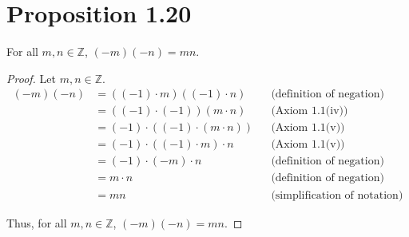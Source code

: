 \section*{Proposition 1.20}
For all $m, n \in \mathbb{Z}$, $(-m)(-n) = mn$.
\begin{proof}
    Let $m, n \in \mathbb{Z}$.
    \begin{align*}
        (-m)(-n) & = ((-1) \cdot m)((-1) \cdot n)        &  & \text{(definition of negation)}     \\
                 & = ((-1) \cdot (-1))(m \cdot n)        &  & \text{(Axiom 1.1(iv))}              \\
                 & = (-1) \cdot ((-1) \cdot (m \cdot n)) &  & \text{(Axiom 1.1(v))}               \\
                 & = (-1) \cdot ((-1) \cdot m) \cdot n   &  & \text{(Axiom 1.1(v))}               \\
                 & = (-1) \cdot (-m) \cdot n             &  & \text{(definition of negation)}     \\
                 & = m \cdot n                           &  & \text{(definition of negation)}     \\
                 & = mn                                  &  & \text{(simplification of notation)}
    \end{align*}

    Thus, for all $m, n \in \mathbb{Z}$, $(-m)(-n) = mn$.
\end{proof}

